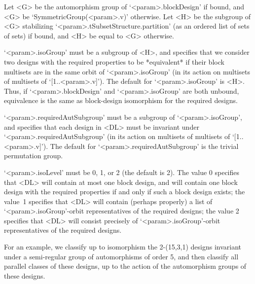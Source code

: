 Let <G> be the automorphism group of `<param>.blockDesign' if bound, and
<G> be `SymmetricGroup(<param>.v)' otherwise. Let <H> be the subgroup of
<G> stabilizing `<param>.tSubsetStructure.partition' (as an ordered list
of sets of sets) if bound, and <H> be equal to <G> otherwise. 

`<param>.isoGroup' must be a subgroup of <H>, and specifies that we
consider two designs with the required properties to be *equivalent*
if their block multisets are in the same orbit of `<param>.isoGroup'
(in its action on multisets of multisets of `[1..<param>.v]'). The
default for `<param>.isoGroup' is <H>. Thus, if `<param>.blockDesign'
and `<param>.isoGroup' are both unbound, equivalence is the same as
block-design isomorphism for the required designs.

`<param>.requiredAutSubgroup' must be a subgroup of `<param>.isoGroup',
and specifies that each design in <DL> must be invariant under
`<param>.requiredAutSubgroup' (in its action on multisets of multisets of
`[1..<param>.v]'). The default for `<param>.requiredAutSubgroup' is the
trivial permutation group.

`<param>.isoLevel' must be 0, 1, or 2 (the default is 2).  The value
0 specifies that <DL> will contain at most one block design, and will
contain one block design with the required properties if and only if
such a block design exists; the value~1 specifies that <DL> will contain
(perhaps properly) a list of `<param>.isoGroup'-orbit representatives of
the required designs; the value 2 specifies that <DL> will consist
precisely of `<param>.isoGroup'-orbit representatives of the required
designs.

For an example, we classify up to isomorphism the 2-(15,3,1) designs
invariant under a semi-regular group of automorphisms of order 5, and
then classify all parallel classes of these designs, up to the action
of the automorphism groups of these designs.

